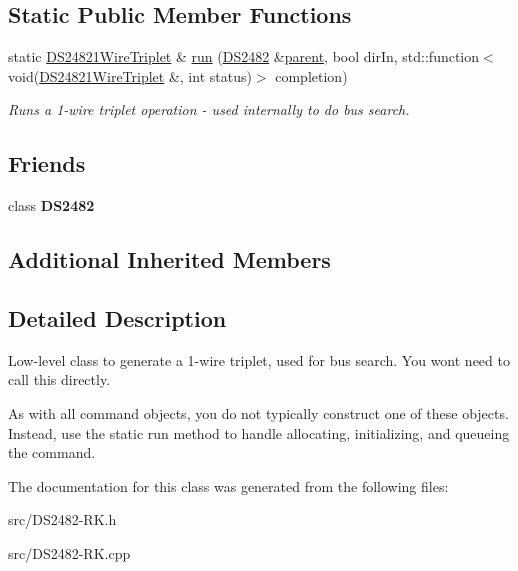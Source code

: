 \subsection*{Static Public Member Functions}
\begin{DoxyCompactItemize}
\item 
\mbox{\label{class_d_s24821_wire_triplet_ab6f4e38254420ee2aca30bbc7cb44213}} 
static \mbox{\hyperlink{class_d_s24821_wire_triplet}{D\+S24821\+Wire\+Triplet}} \& \mbox{\hyperlink{class_d_s24821_wire_triplet_ab6f4e38254420ee2aca30bbc7cb44213}{run}} (\mbox{\hyperlink{class_d_s2482}{D\+S2482}} \&\mbox{\hyperlink{class_d_s2482_command_a54a41fb8a610ef2077f5e5377771aaf3}{parent}}, bool dir\+In, std\+::function$<$ void(\mbox{\hyperlink{class_d_s24821_wire_triplet}{D\+S24821\+Wire\+Triplet}} \&, int status)$>$ completion)
\begin{DoxyCompactList}\small\item\em Runs a 1-\/wire triplet operation -\/ used internally to do bus search. \end{DoxyCompactList}\end{DoxyCompactItemize}
\subsection*{Friends}
\begin{DoxyCompactItemize}
\item 
\mbox{\label{class_d_s24821_wire_triplet_afeaf69274324e8dbeebede05c02d9c18}} 
class {\bfseries D\+S2482}
\end{DoxyCompactItemize}
\subsection*{Additional Inherited Members}


\subsection{Detailed Description}
Low-\/level class to generate a 1-\/wire triplet, used for bus search. You won\textquotesingle{}t need to call this directly. 

As with all command objects, you do not typically construct one of these objects. Instead, use the static run method to handle allocating, initializing, and queueing the command. 

The documentation for this class was generated from the following files\+:\begin{DoxyCompactItemize}
\item 
src/D\+S2482-\/\+R\+K.\+h\item 
src/D\+S2482-\/\+R\+K.\+cpp\end{DoxyCompactItemize}
